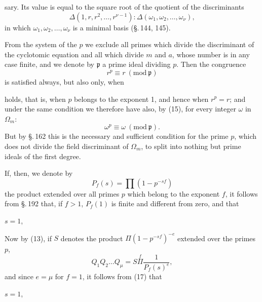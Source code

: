 sary. Its value is equal to the square root of the quotient
of the discriminants
\[
\Delta (1, r, r^2, \ldots, r^{\nu-1}) : \Delta (\omega_1, \omega_2, \ldots, \omega_\nu),
\]
in which $\omega_1, \omega_2, \ldots, \omega_\nu$ is a minimal basis (\S.\,144, 145).

From the system of the $p$ we exclude all primes which divide the discriminant of the cyclotomic equation and all which divide $m$ and $a$, whose number is in any case finite, and we denote by $\mathfrak{p}$ a prime ideal dividing $p$. Then the congruence
\[
r^p \equiv r \ (\mathrm{mod}\ \mathfrak{p})
\]
is satisfied always, but also only, when


holds, that is, when $p$ belongs to the exponent 1, and hence when $r^p = r$; and under the same condition we therefore have also, by (15), for every integer $\omega$ in $\Omega_m$:
\[
\omega^p \equiv \omega \ (\mathrm{mod}\ \mathfrak{p}).
\]
But by \S.\,162 this is the necessary and sufficient condition for the prime $p$, which does not divide the field discriminant of $\Omega_m$, to split into nothing but prime ideals of the first degree.

If, then, we denote by
\[
P_f(s) = \prod (1 - p^{-sf})
\]
the product extended over all primes $p$ which belong to the exponent $f$, it follows from \S.\,192 that, if $f>1$, $P_f(1)$ is finite and different from zero, and that


 $s=1$, 

Now by (13), if $S$ denotes the  product $\Pi(1-p^{-sf})^{-e}$ extended over the  primes $p$,
\[
Q_1 Q_2 \ldots Q_\mu = S \overset{f}{\Pi} \frac{1}{P_f(s)^{e}},
\]
and since $e = \mu$ for $f = 1$, it follows from (17) that


 $s = 1$, 
